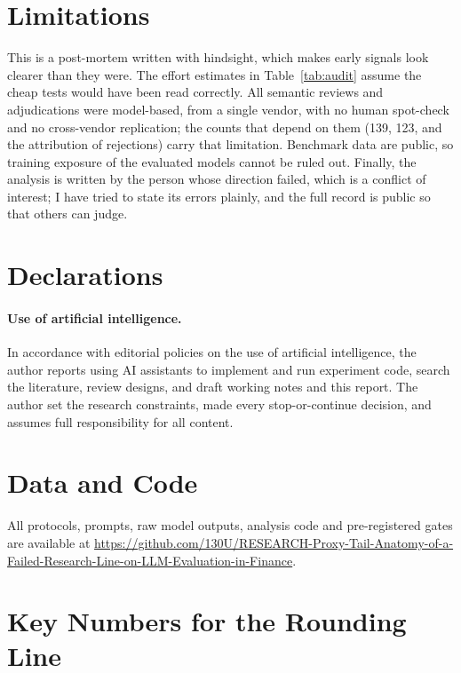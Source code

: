\documentclass[11pt]{article}
\newcommand{\repourl}{https://github.com/130U/RESEARCH-Proxy-Tail-Anatomy-of-a-Failed-Research-Line-on-LLM-Evaluation-in-Finance}
\begin{document}
\section*{Limitations}

This is a post-mortem written with hindsight, which makes early signals look clearer than they were. The effort estimates in Table~\ref{tab:audit} assume the cheap tests would have been read correctly. All semantic reviews and adjudications were model-based, from a single vendor, with no human spot-check and no cross-vendor replication; the counts that depend on them (139, 123, and the attribution of rejections) carry that limitation. Benchmark data are public, so training exposure of the evaluated models cannot be ruled out. Finally, the analysis is written by the person whose direction failed, which is a conflict of interest; I have tried to state its errors plainly, and the full record is public so that others can judge.

\section*{Declarations}

\paragraph{Use of artificial intelligence.} In accordance with editorial policies on the use of artificial intelligence, the author reports using AI assistants to implement and run experiment code, search the literature, review designs, and draft working notes and this report. The author set the research constraints, made every stop-or-continue decision, and assumes full responsibility for all content.

\section*{Data and Code}

All protocols, prompts, raw model outputs, analysis code and pre-registered gates are available at \url{\repourl}.



\appendix

\section{Key Numbers for the Rounding Line}
\label{app:numbers}
\end{document}
